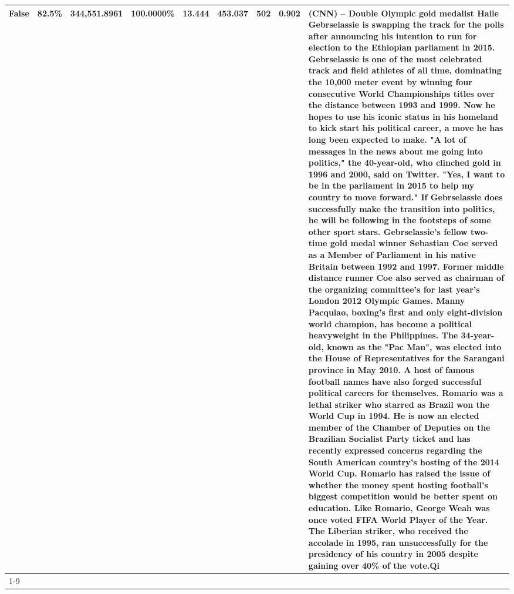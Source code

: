 \begin{table}[H]
{\begin{tabular}{lllrlllll}
False & 82.5\% & 344,551.8961 & \bfseries \color{red} 100.0000\% & 13.444 & 453.037 & 502 & 0.902 & (CNN) -- Double Olympic gold medalist Haile Gebrselassie is swapping the track for the polls after announcing his intention to run for election to the Ethiopian parliament in 2015. Gebrselassie is one of the most celebrated track and field athletes of all time, dominating the 10,000 meter event by winning four consecutive World Championships titles over the distance between 1993 and 1999. Now he hopes to use his iconic status in his homeland to kick start his political career, a move he has long been expected to make. "A lot of messages in the news about me going into politics," the 40-year-old, who clinched gold in 1996 and 2000, said on Twitter. "Yes, I want to be in the parliament in 2015 to help my country to move forward." If Gebrselassie does successfully make the transition into politics, he will be following in the footsteps of some other sport stars. Gebrselassie's fellow two-time gold medal winner Sebastian Coe served as a Member of Parliament in his native Britain between 1992 and 1997. Former middle distance runner Coe also served as chairman of the organizing committee's for last year's London 2012 Olympic Games. Manny Pacquiao, boxing's first and only eight-division world champion, has become a political heavyweight in the Philippines. The 34-year-old, known as the "Pac Man", was elected into the House of Representatives for the Sarangani province in May 2010. A host of famous football names have also forged successful political careers for themselves. Romario was a lethal striker who starred as Brazil won the World Cup in 1994. He is now an elected member of the Chamber of Deputies on the Brazilian Socialist Party ticket and has recently expressed concerns regarding the South American country's hosting of the 2014 World Cup. Romario has raised the issue of whether the money spent hosting football's biggest competition would be better spent on education. Like Romario, George Weah was once voted FIFA World Player of the Year. The Liberian striker, who received the accolade in 1995, ran unsuccessfully for the presidency of his country in 2005 despite gaining over 40\% of the vote.Qi \\
\cline{1-9}

\end{tabular}}
\end{table}
